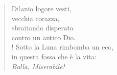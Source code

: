 
\begin{verse}
    Dilanio logore vesti,\\
    vecchia corazza,\\
    sbraitando disperato\\
    contro un antico Dio.\\!
    Sotto la Luna rimbomba un eco,\\
    in questa fossa che è la vita:\\
    \textit{Balla, Miserabile!}
\end{verse}